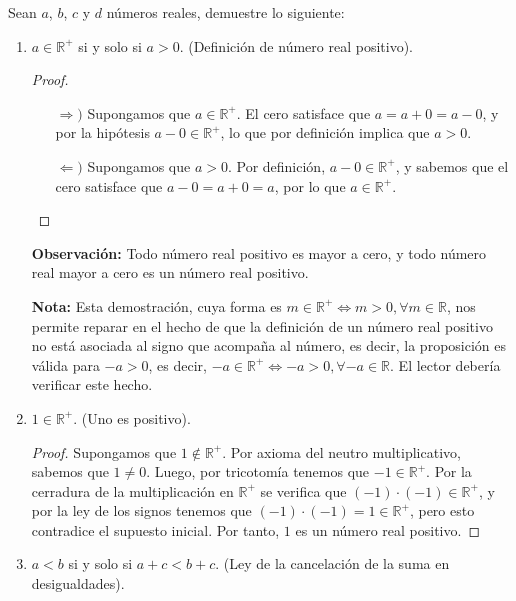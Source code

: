 \documentclass[11pt]{article}
\newcommand{\R}{\mathbb{R}}
\begin{document}
Sean $a$, $b$, $c$ y $d$ números reales, demuestre lo siguiente:
\begin{enumerate}[label=\alph*)]
    \item $a \in \R^+$ si y solo si $a>0$. (Definición de número real positivo).
    \vspace{-1em}\begin{proof} \leavevmode
        \begin{itemize}
            \item[$\Rightarrow)$] Supongamos que $a \in \R^+$. El cero satisface que $a=a+0=a-0$, y por la hipótesis $a-0 \in \R^+$, lo que por definición implica que $a>0$.
            \item[$\Leftarrow)$] Supongamos que $a>0$. Por definición, $a-0 \in \R^+$, y sabemos que el cero satisface que $a-0=a+0=a$, por lo que $a \in \R^+$. \qedhere
        \end{itemize}
    \end{proof} \vspace{-1em}

    \textbf{Observación:} Todo número real positivo es mayor a cero, y todo número real mayor a cero es un número real positivo.
    
    \textbf{Nota:} Esta demostración, cuya forma es $m\in \R^+ \iff m>0, \forall m\in \R$, nos permite reparar en el hecho de que la definición de un número real positivo no está asociada al signo que acompaña al número, es decir, la proposición es válida para $-a>0$, es decir, $-a\in \R^+ \iff -a>0, \forall -a\in \R$. El lector debería verificar este hecho.

    \item $1 \in \R^+$. (Uno es positivo).
    \vspace{-1em}\begin{proof} 
        Supongamos que $1 \notin \R^+$. Por axioma del neutro multiplicativo, sabemos que $1\neq 0$. Luego, por tricotomía tenemos que $-1 \in \R^+$. Por la cerradura de la multiplicación en $\R^+$ se verifica que $(-1) \cdot (-1) \in \R^+$, y por la ley de los signos tenemos que $(-1) \cdot (-1) = 1 \in \R^+$, pero esto contradice el supuesto inicial. Por tanto, $1$ es un número real positivo.    
    \end{proof} \vspace{-1em}

\pagebreak

    \item $a<b$ si y solo si $a+c<b+c$. (Ley de la cancelación de la suma en desigualdades).
    

\end{enumerate}
\end{document}
